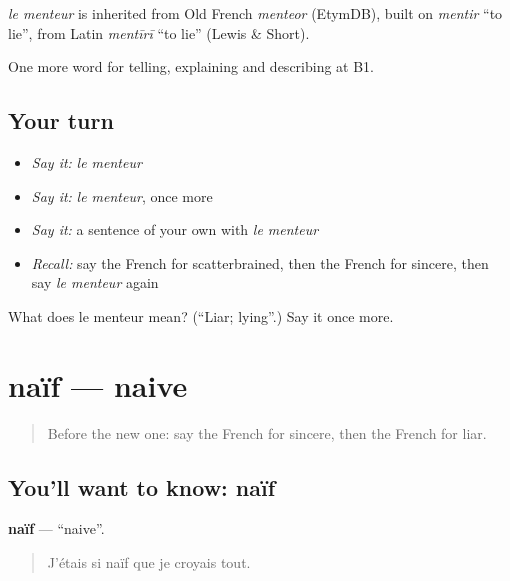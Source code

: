 \begin{cousinweb}
\emph{le menteur} is inherited from Old French \emph{menteor} (EtymDB), built on \emph{mentir} \textquotedblleft{}to lie\textquotedblright{}, from Latin \emph{mentīrī} \textquotedblleft{}to lie\textquotedblright{} (Lewis \& Short).
\end{cousinweb}

\begin{grammarlens}[title={What you've built}]
One more word for telling, explaining and describing at B1.
\end{grammarlens}

\subsection*{Your turn}
\begin{itemize}
\raggedright
  \item \emph{Say it:} \emph{le menteur}
  \item \emph{Say it:} \emph{le menteur}, once more
  \item \emph{Say it:} a sentence of your own with \emph{le menteur}
  \item \emph{Recall:} say the French for scatterbrained, then the French for sincere, then say \emph{le menteur} again
\end{itemize}

\begin{tcolorbox}[breakable,colback=teal!4,colframe=teal!35!black,title={Before you move on}]
What does le menteur mean? (\textquotedblleft{}Liar; lying\textquotedblright{}.) Say it once more.
\end{tcolorbox}
\section[naïf]{naïf — naive}

\label{lesson:FR-C468-naif}



\begin{quote}
Before the new one: say the French for sincere, then the French for liar.
\end{quote}

\subsection*{You'll want to know: naïf}
\textbf{naïf} — \textquotedblleft{}naive\textquotedblright{}.

\begin{quote}
J'étais si naïf que je croyais tout.
\end{quote}

